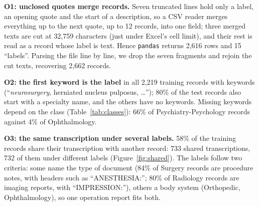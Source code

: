\documentclass[twocolumn,10pt]{article}
\begin{document}
\textbf{O1: unclosed quotes merge records.} Seven truncated lines hold only a label, an opening quote and the start of a description, so a CSV reader merges everything up to the next quote, up to 12 records, into one field; three merged texts are cut at 32,759 characters (just under Excel's cell limit), and their rest is read as a record whose label is text. Hence \texttt{pandas} returns 2,616 rows and 15 ``labels''. Parsing the file line by line, we drop the seven fragments and rejoin the cut texts, recovering 2,662 records.

\textbf{O2: the first keyword is the label} in all 2,219 training records with keywords (``\emph{neurosurgery}, herniated nucleus pulposus, \ldots''); 80\% of the test records also start with a specialty name, and the others have no keywords. Missing keywords depend on the class (Table~\ref{tab:classes}): 66\% of Psychiatry-Psychology records against 4\% of Ophthalmology.

\textbf{O3: the same transcription under several labels.} 58\% of the training records share their transcription with another record: 733 shared transcriptions, 732 of them under different labels (Figure~\ref{fig:shared}). The labels follow two criteria: some name the type of document (84\% of Surgery records are procedure notes, with headers such as ``ANESTHESIA:''; 80\% of Radiology records are imaging reports, with ``IMPRESSION:''), others a body system (Orthopedic, Ophthalmology), so one operation report fits both.
\end{document}
